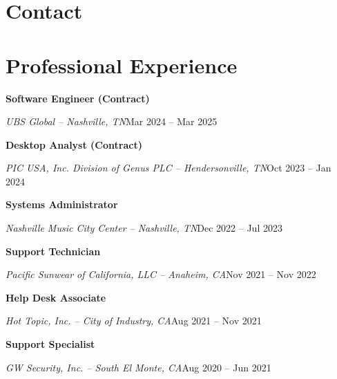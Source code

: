 \documentclass[a4paper]{article}
\begin{document}
\begin{minipage}[t]{0.38\textwidth}
  \raggedright
  \vspace*{0pt}
  {\bfseries\LARGE\textsf\appfirstname{}} {\bfseries\LARGE\textsf\applastname{}}

  \vspace{0.25em}
  \appsynopsis{}

  \section{Contact}
  \vbox{
  }
\end{minipage}\hfill
\begin{minipage}[t]{0.60\textwidth}
  \raggedright
  \vspace*{0pt}

  \section{Professional Experience}
  \textbf{Software Engineer (Contract)}\par
  \textit{UBS Global -- Nashville, TN}\hfill Mar 2024 -- Mar 2025

  \vspace{0.5em}
  \textbf{Desktop Analyst (Contract)}\par
  \textit{PIC USA, Inc. Division of Genus PLC -- Hendersonville, TN}\hfill Oct 2023 -- Jan 2024

  \vspace{0.5em}
  \textbf{Systems Administrator}\par
  \textit{Nashville Music City Center -- Nashville, TN}\hfill Dec 2022 -- Jul 2023

  \vspace{0.5em}
  \textbf{Support Technician}\par
  \textit{Pacific Sunwear of California, LLC -- Anaheim, CA}\hfill Nov 2021 -- Nov 2022

  \vspace{0.5em}
  \textbf{Help Desk Associate}\par
  \textit{Hot Topic, Inc. -- City of Industry, CA}\hfill Aug 2021 -- Nov 2021

  \vspace{0.5em}
  \textbf{Support Specialist}\par
  \textit{GW Security, Inc. -- South El Monte, CA}\hfill Aug 2020 -- Jun 2021
\end{minipage}
\end{document}

